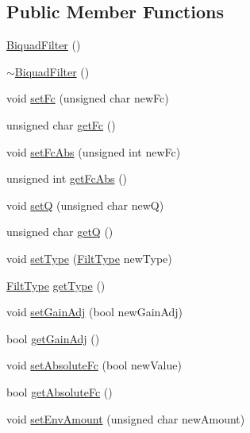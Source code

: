 \subsection*{Public Member Functions}
\begin{DoxyCompactItemize}
\item 
\hyperlink{class_biquad_filter_a58057f61de80a0103d49a075db1843d7}{Biquad\+Filter} ()
\item 
\hyperlink{class_biquad_filter_aafdd776f1b96fd9c01c5ea8adbfae35a}{$\sim$\+Biquad\+Filter} ()
\item 
void \hyperlink{class_biquad_filter_a8622e15237db2ecd042a2efff133ece3}{set\+Fc} (unsigned char new\+Fc)
\item 
unsigned char \hyperlink{class_biquad_filter_ada8a6004b4a56843483e56c0697a5531}{get\+Fc} ()
\item 
void \hyperlink{class_biquad_filter_aa729bb052d8d58e3ee6b5121c2d05810}{set\+Fc\+Abs} (unsigned int new\+Fc)
\item 
unsigned int \hyperlink{class_biquad_filter_ab2e914c95e8d312bbc47a476f5d71945}{get\+Fc\+Abs} ()
\item 
void \hyperlink{class_biquad_filter_adc19385e7684fe4660b4d1f2e433fa00}{setQ} (unsigned char newQ)
\item 
unsigned char \hyperlink{class_biquad_filter_a579a1df530fc036f7d8a28e38b1f760c}{getQ} ()
\item 
void \hyperlink{class_biquad_filter_af31a36e9f121facbabf87d303642d4e2}{set\+Type} (\hyperlink{class_biquad_filter_a173337ea2d17607e19495cf7b91f1110}{Filt\+Type} new\+Type)
\item 
\hyperlink{class_biquad_filter_a173337ea2d17607e19495cf7b91f1110}{Filt\+Type} \hyperlink{class_biquad_filter_ad77052398310ede2df2ba664259317d9}{get\+Type} ()
\item 
void \hyperlink{class_biquad_filter_a8d742032c260e7b5fefddf2cde94facb}{set\+Gain\+Adj} (bool new\+Gain\+Adj)
\item 
bool \hyperlink{class_biquad_filter_a6273d6f759d29500443dd9991125e763}{get\+Gain\+Adj} ()
\item 
void \hyperlink{class_biquad_filter_aa557254793180f2714baee354be5b179}{set\+Absolute\+Fc} (bool new\+Value)
\item 
bool \hyperlink{class_biquad_filter_a4e2b1fd4bb0af7f4bea4709b1bf51792}{get\+Absolute\+Fc} ()
\item 
void \hyperlink{class_biquad_filter_a5bc855d79f31804b2fa8c4b7ef2fba3d}{set\+Env\+Amount} (unsigned char new\+Amount)
\item 

\end{DoxyCompactItemize}
